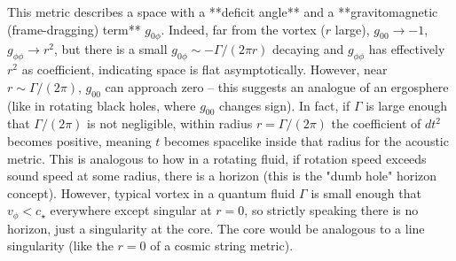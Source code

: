 \documentclass[12pt]{article}
\begin{document}
This metric describes a space with a **deficit angle** and a **gravitomagnetic (frame-dragging) term** $g_{0\phi}$. Indeed, far from the vortex ($r$ large), $g_{00}\to -1$, $g_{\phi\phi} \to r^2$, but there is a small $g_{0\phi} \sim -\Gamma/(2\pi r)$ decaying and $g_{\phi\phi}$ has effectively $r^2$ as coefficient, indicating space is flat asymptotically. However, near $r \sim \Gamma/(2\pi)$, $g_{00}$ can approach zero – this suggests an analogue of an ergosphere (like in rotating black holes, where $g_{00}$ changes sign). In fact, if $\Gamma$ is large enough that $\Gamma/(2\pi)$ is not negligible, within radius $r = \Gamma/(2\pi)$ the coefficient of $dt^2$ becomes positive, meaning $t$ becomes spacelike inside that radius for the acoustic metric. This is analogous to how in a rotating fluid, if rotation speed exceeds sound speed at some radius, there is a horizon (this is the "dumb hole" horizon concept). However, typical vortex in a quantum fluid $\Gamma$ is small enough that $v_\phi < c_\star$ everywhere except singular at $r=0$, so strictly speaking there is no horizon, just a singularity at the core. The core would be analogous to a line singularity (like the $r=0$ of a cosmic string metric). 
\end{document}
